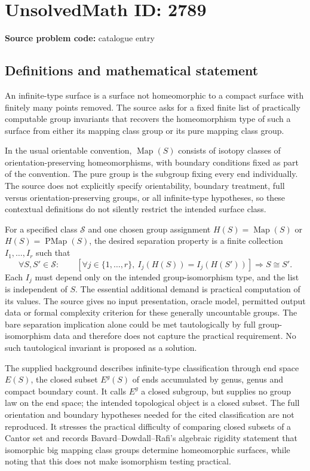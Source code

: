 \documentclass[11pt]{article}
\begin{document}
\section*{UnsolvedMath ID: 2789}
\textbf{Source problem code:} catalogue entry
\subsection{Definitions and mathematical statement}
An infinite-type surface is a surface not homeomorphic to a compact surface with finitely many points removed. The source asks for a fixed finite list of practically computable group invariants that recovers the homeomorphism type of such a surface from either its mapping class group or its pure mapping class group.

In the usual orientable convention, \(\operatorname{Map}(S)\) consists of isotopy classes of orientation-preserving homeomorphisms, with boundary conditions fixed as part of the convention. The pure group is the subgroup fixing every end individually. The source does not explicitly specify orientability, boundary treatment, full versus orientation-preserving groups, or all infinite-type hypotheses, so these contextual definitions do not silently restrict the intended surface class.

For a specified class \(\mathcal S\) and one chosen group assignment \(H(S)=\operatorname{Map}(S)\) or \(H(S)=\operatorname{PMap}(S)\), the desired separation property is a finite collection \(I_1,\ldots,I_r\) such that
\[
\forall S,S'\in\mathcal S:\qquad
\left[\forall j\in\{1,\ldots,r\},\ I_j(H(S))=I_j(H(S'))\right]
\Longrightarrow S\cong S'.
\]
Each \(I_j\) must depend only on the intended group-isomorphism type, and the list is independent of \(S\). The essential additional demand is practical computation of its values. The source gives no input presentation, oracle model, permitted output data or formal complexity criterion for these generally uncountable groups. The bare separation implication alone could be met tautologically by full group-isomorphism data and therefore does not capture the practical requirement. No such tautological invariant is proposed as a solution.

The supplied background describes infinite-type classification through end space \(E(S)\), the closed subset \(E^g(S)\) of ends accumulated by genus, genus and compact boundary count. It calls \(E^g\) a closed subgroup, but supplies no group law on the end space; the intended topological object is a closed subset. The full orientation and boundary hypotheses needed for the cited classification are not reproduced. It stresses the practical difficulty of comparing closed subsets of a Cantor set and records Bavard--Dowdall--Rafi's algebraic rigidity statement that isomorphic big mapping class groups determine homeomorphic surfaces, while noting that this does not make isomorphism testing practical.
\end{document}
